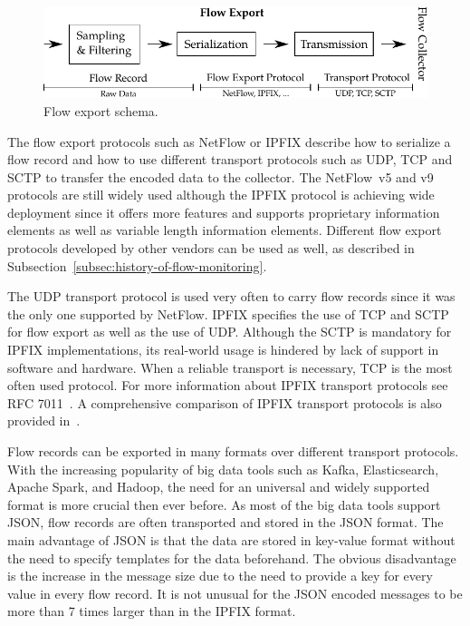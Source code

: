 \begin{figure}[ht!]
  \begin{center}
    \includegraphics[width=\textwidth]{figures/flow-export}
  \end{center}
  \caption{Flow export schema.}
  \label{fig:flow-export}
\end{figure}

The flow export protocols such as NetFlow or IPFIX describe how to serialize a flow record and how to use different transport protocols such as UDP, TCP and SCTP to transfer the encoded data to the collector. The NetFlow~v5 and v9 protocols are still widely used although the IPFIX protocol is achieving wide deployment since it offers more features and supports proprietary information elements as well as variable length information elements. Different flow export protocols developed by other vendors can be used as well, as described in Subsection~\ref{subsec:history-of-flow-monitoring}.

The UDP transport protocol is used very often to carry flow records since it was the only one supported by NetFlow. IPFIX specifies the use of TCP and SCTP for flow export as well as the use of UDP. Although the SCTP is mandatory for IPFIX implementations, its real-world usage is hindered by lack of support in software and hardware. When a reliable transport is necessary, TCP is the most often used protocol. For more information about IPFIX transport protocols see RFC 7011~\cite{rfc7011}. A comprehensive comparison of IPFIX transport protocols is also provided in~\cite{Hofstede-2014-Flow}.

Flow records can be exported in many formats over different transport protocols. With the increasing popularity of big data tools such as Kafka, Elasticsearch, Apache Spark, and Hadoop, the need for an universal and widely supported format is more crucial then ever before. As most of the big data tools support JSON, flow records are often transported and stored in the JSON format. The main advantage of JSON is that the data are stored in key-value format without the need to specify templates for the data beforehand. The obvious disadvantage is the increase in the message size due to the need to provide a key for every value in every flow record. It is not unusual for the JSON encoded messages to be more than 7 times larger than in the IPFIX format.

